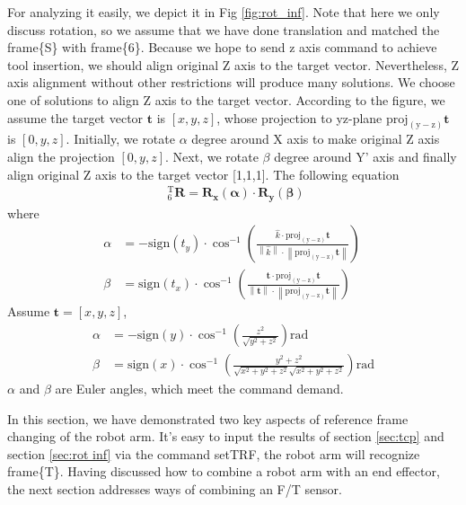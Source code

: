 For analyzing it easily, we depict it in Fig \ref{fig:rot_inf}. Note that here we only discuss rotation, so we assume that we have done translation and matched the frame\{S\} with frame\{6\}. Because we hope to send z axis command to achieve tool insertion, we should align original Z axis to the target vector. Nevertheless, Z axis alignment without other restrictions will produce many solutions. We choose one of solutions to align Z axis to the target vector. According to the figure, we assume the target vector $\boldsymbol{t}$ is $\left[x,y,z\right]$, whose projection to yz-plane $\mathrm{proj_{(y-z)}}\boldsymbol{t}$ is $\left[0,y,z\right]$. Initially, we rotate $\alpha$ degree around X axis to make original Z axis align the projection $\left[0,y,z\right]$. Next, we rotate $\beta$ degree around Y' axis and finally align original Z axis to the target vector [1,1,1]. The following equation 
\begin{equation}
\begin{split}
\ \  _{\mathrm{6}}^{\mathrm{T}}\mathbf{R} = \mathbf{R_x(\alpha)} \cdot \mathbf{R_y(\beta)}
\end{split}
\end{equation}
where
\begin{equation}
\begin{split}
\alpha &= 
-\mathrm{sign}(t_y)\cdot \cos^{-1} \left(  \frac{\hat{k}						\cdot 		\mathrm{proj_{(y-z)}}\boldsymbol{t}				}
								 				{\left \| \hat{k} \right \| 	\cdot \left \| \mathrm{proj_{(y-z)}}\boldsymbol{t} \right \|} \right)\ \\
\beta  &= 
\mathrm{sign}(t_x)\cdot \cos^{-1} \left( \frac{\textbf{t}							\cdot 		\mathrm{proj_{(y-z)}}\boldsymbol{t}			}
								  			  {\left \| \textbf{t}\right \| 	\cdot \left \| \mathrm{proj_{(y-z)}}\boldsymbol{t} \right \|} \right)\ 
\end{split}
\end{equation}
Assume $\boldsymbol{t} = [x,y,z]$,
\begin{equation}
\begin{split}
\alpha &= 
-\mathrm{sign}(y)\cdot \cos^{-1}	\left( \frac{z^2}{\sqrt{y^2+z^2}} \right) \mathrm{rad}\\
\beta  &= 
\mathrm{sign}(x)\cdot \cos^{-1} \left( \frac{y^2+z^2}{\sqrt{x^2+y^2+z^2}\sqrt{x^2+y^2+z^2}} \right) \mathrm{rad}
\end{split}
\end{equation}
$\alpha$ and $\beta$ are Euler angles, which meet the command demand.

In this section, we have demonstrated two key aspects of reference frame changing of the robot arm. It's easy to input the results of section \ref{sec:tcp} and section \ref{sec:rot inf} via the command setTRF, the robot arm will recognize frame\{T\}. Having discussed how to combine a robot arm with an end effector, the next section addresses ways of combining an F/T sensor.
